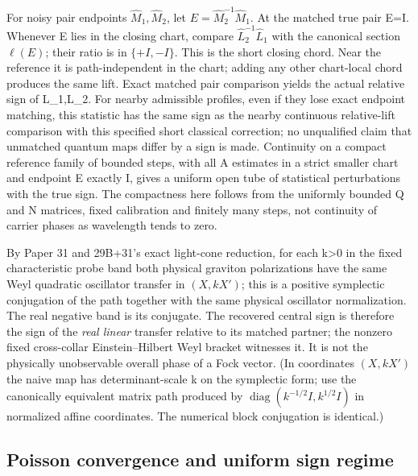 \documentclass[11pt]{article}
\begin{document}
For noisy pair endpoints \(\widehat M_1,\widehat M_2\), let \(E=\widehat M_2^{-1}\widehat M_1\). At the matched true pair E=I. Whenever E lies in the closing chart, compare \(\widehat L_2^{-1}\widehat L_1\) with the canonical section \(\ell(E)\); their ratio is in \(\{+I,-I\}\). This is the short closing chord. Near the reference it is path-independent in the chart; adding any other chart-local chord produces the same lift. Exact matched pair comparison yields the actual relative sign of L\_1,L\_2. For nearby admissible profiles, even if they lose exact endpoint matching, this statistic has the same sign as the nearby continuous relative-lift comparison with this specified short classical correction; no unqualified claim that unmatched quantum maps differ by a sign is made. Continuity on a compact reference family of bounded steps, with all A estimates in a strict smaller chart and endpoint E exactly I, gives a uniform open tube of statistical perturbations with the true sign. The compactness here follows from the uniformly bounded Q and N matrices, fixed calibration and finitely many steps, not continuity of carrier phases as wavelength tends to zero.

By Paper 31 and 29B+31's exact light-cone reduction, for each k\textgreater0 in the fixed characteristic probe band both physical graviton polarizations have the same Weyl quadratic oscillator transfer in \((X,kX')\); this is a positive symplectic conjugation of the path together with the same physical oscillator normalization. The real negative band is its conjugate. The recovered central sign is therefore the sign of the \emph{real linear} transfer relative to its matched partner; the nonzero fixed cross-collar Einstein--Hilbert Weyl bracket witnesses it. It is not the physically unobservable overall phase of a Fock vector. (In coordinates \((X,kX')\) the naive map has determinant-scale k on the symplectic form; use the canonically equivalent matrix path produced by \(\operatorname{diag}(k^{-1/2}I,k^{1/2}I)\) in normalized affine coordinates. The numerical block conjugation is identical.)

\subsection{Poisson convergence and uniform sign regime}\label{poisson-convergence-and-uniform-sign-regime}
\end{document}
